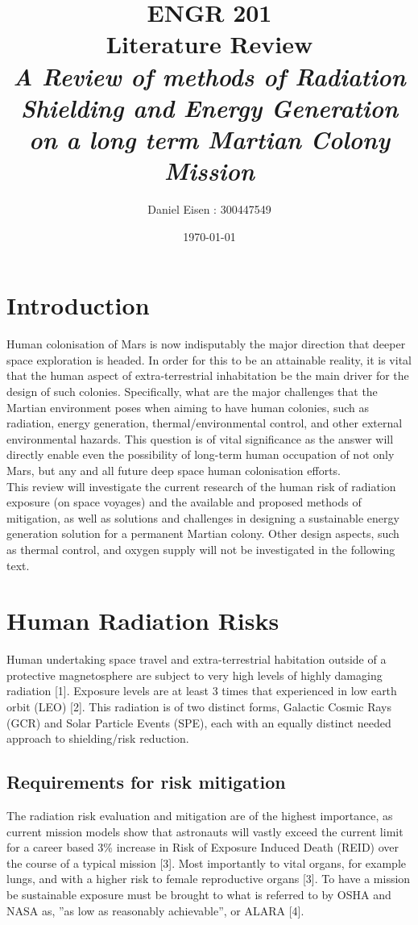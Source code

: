 \documentclass[12pt]{article}
\title{ENGR 201 \\ Literature Review \\ \textit{A Review of methods of Radiation Shielding and Energy Generation on a long term Martian Colony Mission}}
\author{Daniel Eisen : 300447549}
\date{\today}
\begin{document}
\maketitle
\newpage
\section{Introduction}
Human colonisation of Mars is now indisputably the major direction that deeper space exploration is headed. In order for this to be an attainable reality, it is vital that the human aspect of extra-terrestrial inhabitation be the main driver for the design of such colonies. Specifically, what are the major challenges that the Martian environment poses when aiming to have human colonies, such as radiation, energy generation, thermal/environmental control, and other external environmental hazards. This question is of vital significance as the answer will directly enable even the possibility of long-term human occupation of not only Mars, but any and all future deep space human colonisation efforts.
\\
This review will investigate the current research of the human risk of radiation exposure (on space voyages) and the available and proposed methods of mitigation, as well as solutions and challenges in designing a sustainable energy generation solution for a permanent Martian colony. Other design aspects, such as thermal control, and oxygen supply will not be investigated in the following text.



\section{Human Radiation Risks}
Human undertaking space travel and extra-terrestrial habitation outside of a protective magnetosphere are subject to very high levels of highly damaging radiation [1]. Exposure levels are at least 3 times that experienced in low earth orbit (LEO) [2]. This radiation is of two distinct forms, Galactic Cosmic Rays (GCR) and Solar Particle Events (SPE), each with an equally distinct needed approach to shielding/risk reduction.

\subsection{Requirements for risk mitigation}
The radiation risk evaluation and mitigation are of the highest importance, as current mission models show that astronauts will vastly exceed the current limit for a career based 3\% increase in Risk of Exposure Induced Death (REID) over the course of a typical mission [3]. Most importantly to vital organs, for example lungs, and with a higher risk to female reproductive organs [3]. To have a mission be sustainable exposure must be brought to what is referred to by OSHA and NASA as, ”as low as reasonably achievable”, or ALARA [4].
\end{document}
